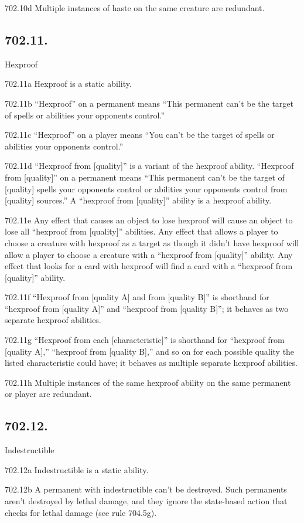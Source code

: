 702.10d Multiple instances of haste on the same creature are redundant.

\subsection*{702.11.}
Hexproof

702.11a Hexproof is a static ability.

702.11b “Hexproof” on a permanent means “This permanent can’t be the target of spells or abilities your opponents control.”

702.11c “Hexproof” on a player means “You can’t be the target of spells or abilities your opponents control.”

702.11d “Hexproof from [quality]” is a variant of the hexproof ability. “Hexproof from [quality]” on a permanent means “This permanent can’t be the target of [quality] spells your opponents control or abilities your opponents control from [quality] sources.” A “hexproof from [quality]” ability is a hexproof ability.

702.11e Any effect that causes an object to lose hexproof will cause an object to lose all “hexproof from [quality]” abilities. Any effect that allows a player to choose a creature with hexproof as a target as though it didn’t have hexproof will allow a player to choose a creature with a “hexproof from [quality]” ability. Any effect that looks for a card with hexproof will find a card with a “hexproof from [quality]” ability.

702.11f “Hexproof from [quality A] and from [quality B]” is shorthand for “hexproof from [quality A]” and “hexproof from [quality B]”; it behaves as two separate hexproof abilities.

702.11g “Hexproof from each [characteristic]” is shorthand for “hexproof from [quality A],” “hexproof from [quality B],” and so on for each possible quality the listed characteristic could have; it behaves as multiple separate hexproof abilities.

702.11h Multiple instances of the same hexproof ability on the same permanent or player are redundant.

\subsection*{702.12.}
Indestructible

702.12a Indestructible is a static ability.

702.12b A permanent with indestructible can’t be destroyed. Such permanents aren’t destroyed by lethal damage, and they ignore the state-based action that checks for lethal damage (see rule 704.5g).

